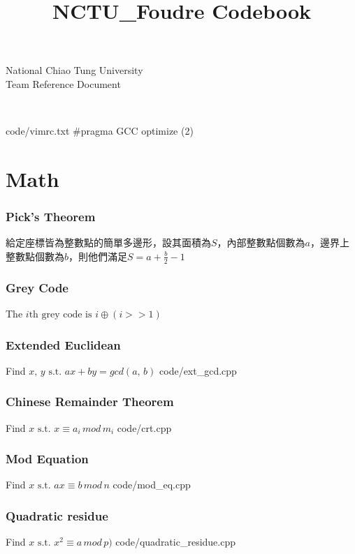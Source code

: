 \documentclass [landscape,8pt,a4paper,twocolumn]{article}
\title {NCTU\_Foudre Codebook}
\begin{document}
\thispagestyle{fancy}
{ \Huge National Chiao Tung University \\
Team Reference Document}
\tableofcontents

~\newline
~\newline
~\newline

 {code/vimrc.txt}
\#pragma GCC optimize (2)

\newpage
\part{Math}

\section{Pick's Theorem}
給定座標皆為整數點的簡單多邊形，設其面積為$ S $，內部整數點個數為$ a $，邊界上整數點個數為$ b $，則他們滿足$ S=a+\frac{b}{2}-1 $

\section{Grey Code}
The $ i \text{th grey code is } i \oplus (i>>1) $

\section{Extended Euclidean}
Find $ x, \, y \text{ s.t. } ax+by=gcd(a, \, b) $
 {code/ext_gcd.cpp}

\section{Chinese Remainder Theorem}
Find $ x \text{ s.t. } x \equiv a_i \, mod \, m_i $
 {code/crt.cpp}

\section{Mod Equation}
Find $ x \text{ s.t. } ax \equiv b \, mod \, n $
 {code/mod_eq.cpp}

\section{Quadratic residue}
Find $ x \text{ s.t. } x^2 \equiv a \, mod \, p) $
{code/quadratic_residue.cpp}
\end{document}

